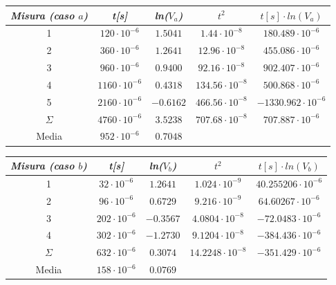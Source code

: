     \begin{center}
    \begin{tabular}{|c|c|c|c|c|}
        \hline
        \textit{Misura (caso $a$)} & \textit{t[s]} & \textit{ln($V_a$)} & \textit{$t^2$} & \textit{$t[s] \cdot ln(V_a)$} \\
        \hline
        1 & $120 \cdot 10^{-6}$ & $1.5041$ & $1.44 \cdot 10^{-8}$ & $180.489 \cdot 10^{-6}$ \\
        \hline
        2 & $360 \cdot 10^{-6}$ & $1.2641$ & $12.96 \cdot 10^{-8}$ & $455.086 \cdot 10^{-6}$ \\
        \hline
        3 & $960 \cdot 10^{-6}$ & $0.9400$ & $92.16 \cdot 10^{-8}$ & $902.407 \cdot 10^{-6}$ \\
        \hline
        4 & $1160 \cdot 10^{-6}$ & $0.4318$ & $134.56 \cdot 10^{-8}$ & $500.868 \cdot 10^{-6}$ \\
        \hline
        5 & $2160 \cdot 10^{-6}$ & $-0.6162$ & $466.56 \cdot 10^{-8}$ & $-1330.962 \cdot 10^{-6}$ \\
        \hline
        $\varSigma$ & $4760 \cdot 10^{-6}$ & $3.5238$ & $707.68 \cdot 10^{-8}$ & $707.887 \cdot 10^{-6}$ \\
        \hline
        Media & $952 \cdot 10^{-6}$ & $0.7048$ & \multicolumn{2}{c}{} \\
        \hline
    \end{tabular}
    \begin{tabular}{|c|c|c|c|c|}
        \hline
        \textit{Misura (caso $b$)} & \textit{t[s]} & \textit{ln($V_b$)} & \textit{$t^2$} & \textit{$t[s] \cdot ln(V_b)$} \\
        \hline
        1 & $32 \cdot 10^{-6}$ & $1.2641$ & $1.024 \cdot 10^{-9}$ & $40.255206 \cdot 10^{-6}$ \\
        \hline
        2 & $96 \cdot 10^{-6}$ & $0.6729$ & $9.216 \cdot 10^{-9}$ & $64.60267 \cdot 10^{-6}$ \\
        \hline
        3 & $202 \cdot 10^{-6}$ & $-0.3567$ & $4.0804 \cdot 10^{-8}$ & $-72.0483 \cdot 10^{-6}$ \\
        \hline
        4 & $302 \cdot 10^{-6}$ & $-1.2730$ & $9.1204 \cdot 10^{-8}$ & $-384.436 \cdot 10^{-6}$ \\
        \hline
        $\varSigma$ & $632 \cdot 10^{-6}$ & $0.3074$ & $14.2248 \cdot 10^{-8}$ & $-351.429 \cdot 10^{-6}$ \\
        \hline
        Media & $158 \cdot 10^{-6}$ & $0.0769$ & \multicolumn{2}{c}{} \\
        \hline

\end{tabular}
\end{center}

